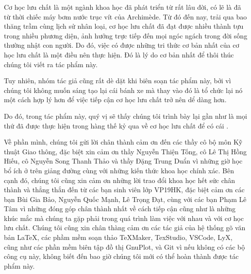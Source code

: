 \documentclass[main.tex]{subfiles}
\begin{document}
	Cơ học lưu chất là một ngành khoa học đã phát triển từ rất lâu đời, có lẽ là đã từ thời chiếc máy bơm nước trục vít của Archimède. Từ đó đến nay, trải qua bao thăng trầm cùng lịch sử nhân loại, cơ học lưu chất đã đạt được nhiều thành tựu trong nhiều phương diện, ảnh hưởng trực tiếp đến mọi ngóc ngách trong đời sống thường nhật con người. Do đó, việc có được những tri thức cơ bản nhất của cơ học lưu chất là một điều nên thực hiện. Đó là lý do cơ bản nhất để thôi thúc chúng tôi viết ra tác phẩm này.
	
	Tuy nhiên, nhóm tác giả cũng rất dè dặt khi biên soạn tác phẩm này, bởi vì chúng tôi không muốn sáng tạo lại cái bánh xe mà thay vào đó là tổ chức lại nó một cách hợp lý hơn để việc tiếp cận cơ học lưu chất trở nên dể dàng hơn.
	
	Do đó, trong tác phẩm này, quý vị sẽ thấy chúng tôi trình bày lại gần như là mọi thứ đã được thực hiện trong hàng thế kỷ qua về cơ học lưu chất để có cái .
	
	Về phần mình, chúng tôi gửi lời chân thành cảm ơn đến các thầy cô bộ môn Kỹ thuật Giao thông, đặc biệt xin cảm ơn thầy Nguyễn Thiện Tống, cô Lê Thị Hồng Hiếu, cô Nguyễn Song Thanh Thảo và thầy Đặng Trung Duẩn vì những giờ học bổ ích ở trên giảng đường cùng với những kiến thức khoa học chính xác. Bên cạnh đó, chúng tôi cũng xin cảm ơn những lời trao đổi khoa học hết sức chân thành và thẳng thắn đến từ các bạn sinh viên lớp VP19HK, đặc biệt cảm ơn các bạn Bùi Gia Bảo, Nguyễn Quốc Mạnh, Lê Trọng Đạt, cùng với các bạn Phạm Lê Tâm vì những đóng góp chân thành nhất về cách tiếp cận cũng như là những khúc mắc mà chúng ta gặp phải trong quá trình làm việc với nhau và với cơ học lưu chất. Chúng tôi cũng xin chân thàng cảm ơn các tác giả của hệ thống gõ văn bản \LaTeX, các phầm mềm soạn thảo TeXMaker, TexStudio, VSCode, LyX, cũng như các phần mềm biên tập đồ thị GnuPlot, và Git vì nếu không có các bộ công cụ này, không biết đến bao giờ chúng tôi mới có thể hoàn thành được tác phẩm này.
\end{document}
